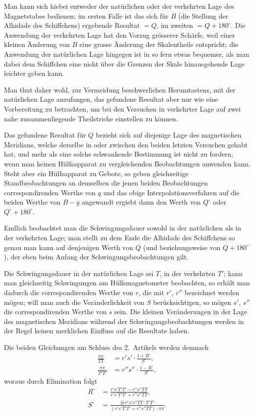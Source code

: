 \documentclass[12pt,a4paper]{article}
\begin{document}
Man kann sich hiebei entweder der natürlichen oder der verkehrten Lage des Magnetstabes bedienen; im ersten Falle ist das sich für $B$ (die Stellung der Alhidade des Schiffchens) ergebende Resultat $= Q$, im zweiten $= Q + 180^{\circ}$. Die Anwendung der verkehrten Lage hat den Vorzug grösserer Schärfe, weil einer kleinen Änderung von $B$ eine grosse Änderung der Skalentheile entspricht; die Anwendung der natürlichen Lage hingegen ist in so fern etwas bequemer, als man dabei dem Schiffchen eine nicht über die Grenzen der Skale hinausgehende Lage leichter geben kann.

Man thut daher wohl, zur Vermeidung beschwerlichen Herumtastens, mit der natürlichen Lage anzufangen, das gefundene Resultat aber nur wie eine Vorbereitung zu betrachten, um bei den Versuchen in verkehrter Lage auf zwei nahe zusammenliegende Theilstriche einstellen zu können.

Das gefundene Resultat für $Q$ bezieht sich auf diejenige Lage des magnetischen Meridians, welche derselbe in oder zwischen den beiden letzten Versuchen gehabt hat, und mehr als eine solche schwankende Bestimmung ist nicht zu fordern, wenn man keinen Hülfsapparat zu vergleichenden Beobachtungen anwenden kann. Steht aber ein Hülfsapparat zu Gebote, so geben gleichzeitige Standbeobachtungen an demselben die jenen beiden Beobachtungen correspondirenden Werthe von $q$ und das obige Interpolationsverfahren auf die beiden Werthe von $B - q$ angewandt ergiebt dann den Werth von $Q^{\circ}$ oder $Q^{\circ} + 180^{\circ}$.

Endlich beobachtet man die Schwingungsdauer sowohl in der natürlichen als in der verkehrten Lage; man stellt zu dem Ende die Alhidade des Schiffchens so genau man kann auf denjenigen Werth von $Q$ (und beziehungsweise von $Q + 180^{\circ}$), der eben beim Anfang der Schwingungsbeobachtungen gilt.

Die Schwingungsdauer in der natürlichen Lage sei $T$, in der verkehrten $T'$; kann man gleichzeitig Schwingungen am Hülfsmagnetometer beobachten, so erhält man dadurch die correspondirenden Werthe von $r$, die mit $r'$, $r''$ bezeichnet werden mögen; will man auch die Veränderlichkeit von $S$ berücksichtigen, so mögen $s'$, $s''$ die correspondirenden Werthe von $s$ sein. Die kleinen Veränderungen in der Lage des magnetischen Meridians während der Schwingungsbeobachtungen werden in der Regel keinen merklichen Einfluss auf die Resultate haben.

Die beiden Gleichungen am Schluss des 2.~Artikels werden demnach
\begin{align}
\frac{\pi\pi}{TT} &= r' s' \cdot \frac{1 + R^{\circ}}{S^{\circ}},\\
\frac{\pi\pi}{T'T'} &= r'' s'' \cdot \frac{1 - R^{\circ}}{S^{\circ}},
\end{align}
woraus durch Elimination folgt
\begin{align}
R^{\circ} &= \frac{r's'T'T' - r''s''TT}{r's'T'T' + r''s''TT},\\
S^{\circ} &= \frac{2rr's's''TT \cdot T'T'}{(r's'T'T' + r''s''TT) \cdot \pi\pi}.
\end{align}
\end{document}
